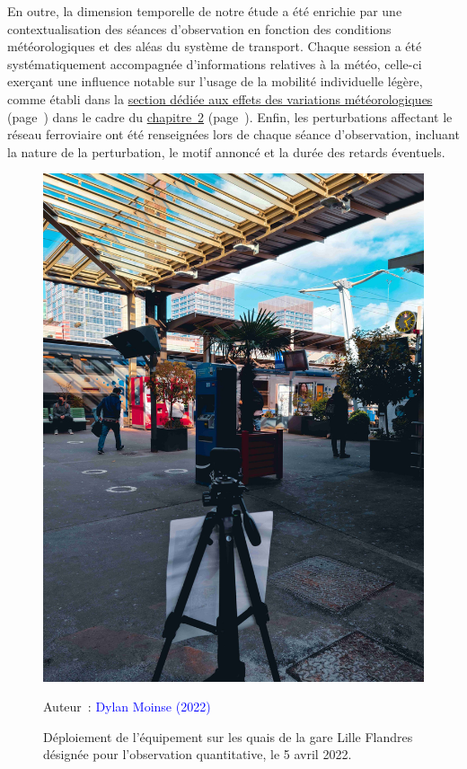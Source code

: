 \begin{refsegment}
En outre, la dimension temporelle de notre étude a été enrichie par une contextualisation des séances d'observation en fonction des conditions météorologiques et des aléas du système de transport. Chaque session a été systématiquement accompagnée d'informations relatives à la météo, celle-ci exerçant une influence notable sur l'usage de la mobilité individuelle légère, comme établi dans la \hyperref[chap2:impacts-meteo-saisons]{section dédiée aux effets des variations météorologiques} (page~\pageref{chap2:impacts-meteo-saisons}) dans le cadre du \hyperref[chap2:titre]{chapitre~2} (page~\pageref{chap2:titre}). Enfin, les perturbations affectant le réseau ferroviaire ont été renseignées lors de chaque séance d'observation, incluant la nature de la perturbation, le motif annoncé et la durée des retards éventuels.%

    \begin{figure}[h!]\vspace*{4pt}
        \caption{Déploiement de l'équipement sur les quais de la gare Lille Flandres désignée pour l'observation quantitative, le 5 avril 2022.}
        \label{fig-chap3:materiel-observation-quantitative}
        \centerline{\includegraphics[width=0.5\columnwidth]{src/Figures/Chap-3/FR_Observation_Camera_Lille_Flandres.jpg}}
        \vspace{5pt}
        \begin{flushright}\scriptsize{
        Auteur~: \textcolor{blue}{Dylan Moinse (2022)}
        }\end{flushright}
    \end{figure}


\end{refsegment}
